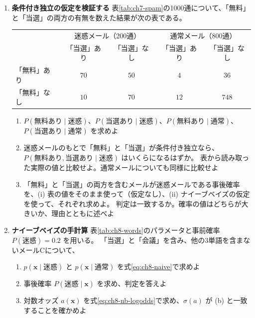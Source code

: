 \begin{enumerate}
  \item \textbf{条件付き独立の仮定を検証する}\quad
    表\ref{tab:ch7-spam}の1000通について、「無料」と「当選」の両方の有無を数えた結果が次の表である。
    \begin{center}
      \begin{tabular}{l|cc|cc}
        \hline
         & \multicolumn{2}{c|}{迷惑メール（200通）} & \multicolumn{2}{c}{通常メール（800通）} \\
         & 「当選」あり & 「当選」なし & 「当選」あり & 「当選」なし \\
        \hline
        「無料」あり & $70$ & $50$ & $4$ & $36$ \\
        「無料」なし & $10$ & $70$ & $12$ & $748$ \\
        \hline
      \end{tabular}
    \end{center}
    \begin{enumerate}
      \item $P(\text{無料あり} \mid \text{迷惑})$、$P(\text{当選あり} \mid \text{迷惑})$、$P(\text{無料あり} \mid \text{通常})$、$P(\text{当選あり} \mid \text{通常})$ を求めよ
      \item 迷惑メールのもとで「無料」と「当選」が条件付き独立なら、$P(\text{無料あり}, \text{当選あり} \mid \text{迷惑})$ はいくらになるはずか。
        表から読み取った実際の値と比較せよ。通常メールについても同様に比較せよ
      \item 「無料」と「当選」の両方を含むメールが迷惑メールである事後確率を、(i) 表の値をそのまま使って（仮定なし）、(ii) ナイーブベイズの仮定を使って、それぞれ求めよ。
        判定は一致するか。確率の値はどちらが大きいか、理由とともに述べよ
    \end{enumerate}

  \item \textbf{ナイーブベイズの手計算}\quad
    表\ref{tab:ch8-words}のパラメータと事前確率 $P(\text{迷惑}) = 0.2$ を用いる。
    「当選」と「会議」を含み、他の3単語を含まないメールCについて、
    \begin{enumerate}
      \item $p(\bm{x} \mid \text{迷惑})$ と $p(\bm{x} \mid \text{通常})$ を式\eqref{eq:ch8-naive}で求めよ
      \item 事後確率 $P(\text{迷惑} \mid \bm{x})$ を求め、判定を答えよ
      \item 対数オッズ $a(\bm{x})$ を式\eqref{eq:ch8-nb-logodds}で求め、$\sigma(a)$ が (b) と一致することを確かめよ
    \end{enumerate}


\end{enumerate}
